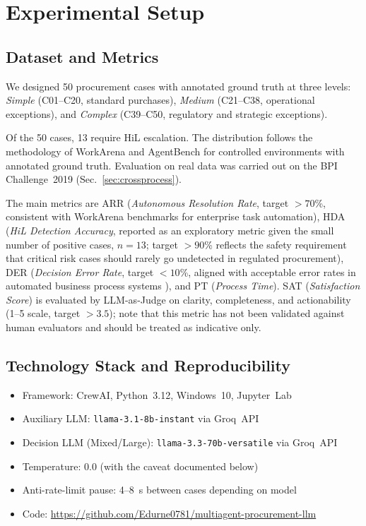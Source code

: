 \documentclass[preprint,12pt,numrefs]{elsarticle}
\begin{document}
\section{Experimental Setup}
\label{sec:setup}

\subsection{Dataset and Metrics}

We designed 50 procurement cases with annotated ground truth at three
levels: \emph{Simple} (C01--C20, standard purchases), \emph{Medium}
(C21--C38, operational exceptions), and \emph{Complex} (C39--C50,
regulatory and strategic exceptions).

Of the 50 cases, 13 require HiL escalation. The distribution follows
the methodology of WorkArena \citep{drouin2024workarena} and AgentBench
\citep{liu2023agentbench} for controlled environments with annotated
ground truth. Evaluation on real data was carried out on the BPI
Challenge~2019 \citep{vandongen2019bpi}
(Sec.~\ref{sec:crossprocess}).

The main metrics are ARR (\emph{Autonomous Resolution Rate}, target
$>70$\%, consistent with WorkArena \citep{drouin2024workarena} benchmarks
for enterprise task automation), HDA (\emph{HiL Detection Accuracy},
reported as an exploratory metric given the small number of positive
cases, $n=13$; target $>90$\% reflects the safety requirement that
critical risk cases should rarely go undetected in regulated
procurement), DER (\emph{Decision Error Rate}, target $<10$\%,
aligned with acceptable error rates in automated business process
systems \citep{Aguirre2017rpa}), and PT (\emph{Process Time}).
SAT (\emph{Satisfaction Score}) is evaluated by LLM-as-Judge
\citep{zheng2023judging} on clarity, completeness, and actionability
(1--5 scale, target $>3{.}5$); note that this metric has not been
validated against human evaluators and should be treated as
indicative only.

\subsection{Technology Stack and Reproducibility}

\begin{itemize}
  \item Framework: CrewAI, Python~3.12, Windows~10, Jupyter~Lab
  \item Auxiliary LLM: \texttt{llama-3.1-8b-instant} via Groq~API \citep{Groq2024}
  \item Decision LLM (Mixed/Large): \texttt{llama-3.3-70b-versatile} via Groq~API
  \item Temperature: 0.0 (with the caveat documented below)
  \item Anti-rate-limit pause: 4--8~s between cases depending on model
  \item Code: \url{https://github.com/Edurne0781/multiagent-procurement-llm}
\end{itemize}
\end{document}
